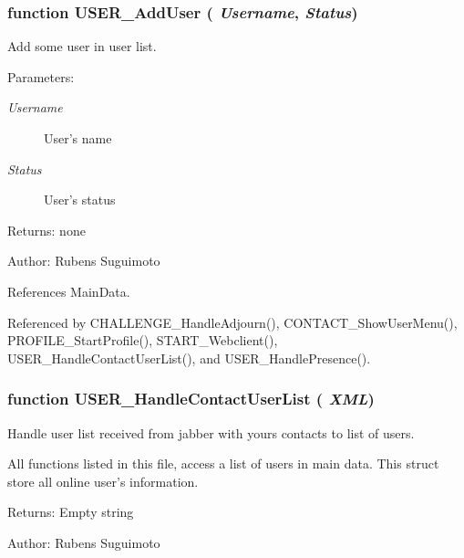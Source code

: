 \subsubsection[USER\_\-AddUser]{\setlength{\rightskip}{0pt plus 5cm}function USER\_\-AddUser ( {\em Username}, \/   {\em Status})}\label{contact_2user_8js_4a5328ce623345e14d5cc5ff17c932d8}


Add some user in user list. 

\begin{Desc}
\item[Parameters:]
\begin{description}
\item[{\em Username}]User's name \item[{\em Status}]User's status \end{description}
\end{Desc}
\begin{Desc}
\item[Returns:]none \end{Desc}
\begin{Desc}
\item[Author:]Rubens Suguimoto \end{Desc}


References MainData.

Referenced by CHALLENGE\_\-HandleAdjourn(), CONTACT\_\-ShowUserMenu(), PROFILE\_\-StartProfile(), START\_\-Webclient(), USER\_\-HandleContactUserList(), and USER\_\-HandlePresence().
\subsubsection[USER\_\-HandleContactUserList]{\setlength{\rightskip}{0pt plus 5cm}function USER\_\-HandleContactUserList ( {\em XML})}\label{contact_2user_8js_44ccc2e2f9756dbfd5449002b0d2a69c}


Handle user list received from jabber with yours contacts to list of users. 

All functions listed in this file, access a list of users in main data. This struct store all online user's information.

\begin{Desc}
\item[Returns:]Empty string \end{Desc}
\begin{Desc}
\item[Author:]Rubens Suguimoto \end{Desc}


